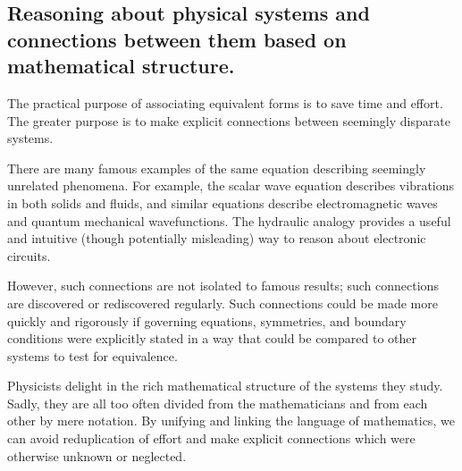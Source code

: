 \documentclass[12pt,letterpaper]{article}
\begin{document}
\subsection{Reasoning about physical systems and connections between them based on mathematical structure.}

The practical purpose of associating equivalent forms is to save time and effort.
The greater purpose is to make explicit connections between seemingly disparate systems.

There are many famous examples of the same equation describing seemingly unrelated phenomena.
For example,
the scalar wave equation describes vibrations in both solids and fluids,
and similar equations describe electromagnetic waves and quantum mechanical wavefunctions.
The hydraulic analogy provides a useful and intuitive
(though potentially misleading)
way to reason about electronic circuits.

However,
such connections are not isolated to famous results;
such connections are discovered or rediscovered regularly.
Such connections could be made more quickly and rigorously if governing equations,
symmetries, and boundary conditions were explicitly stated in a way that could be compared to other systems to test for equivalence.

Physicists delight in the rich mathematical structure of the systems they study.
Sadly, they are all too often divided from the mathematicians and from each other by mere notation.
By unifying and linking the language of mathematics,
we can avoid reduplication of effort and make explicit connections which were otherwise unknown or neglected.
\end{document}
